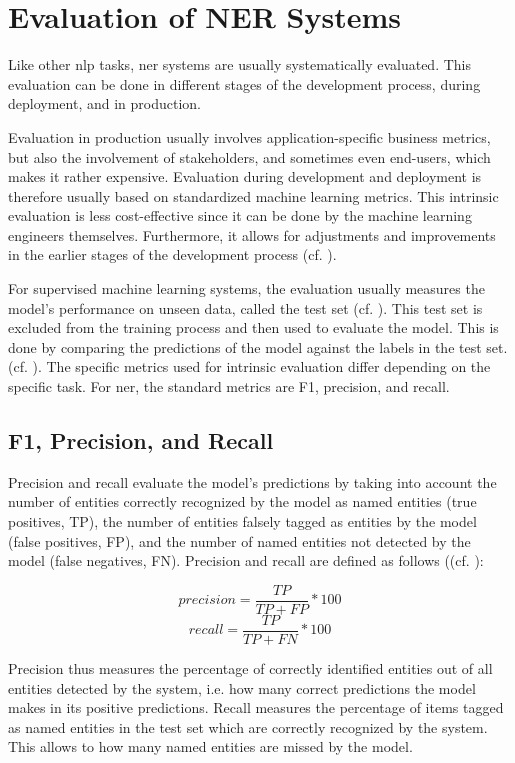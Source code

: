 \section{Evaluation of NER Systems}
\label{evaluation_metrics}

Like other \gls{nlp} tasks, \gls{ner} systems are usually systematically evaluated. This evaluation can be done in different stages of the development process, during deployment, and in production. 

Evaluation in production usually involves application-specific business metrics, but also the involvement of stakeholders, and sometimes even end-users, which makes it rather expensive. 
Evaluation during development and deployment is therefore usually based on standardized machine learning metrics. This intrinsic evaluation is less cost-effective since it can be done by the machine learning engineers themselves. Furthermore, it allows for adjustments and improvements in the earlier stages of the development process (cf. \cite[71]{vajjala_practical_2020}). 

For supervised machine learning systems, the evaluation usually measures  the model's performance on unseen data, called the test set (cf. \cite[35]{jurafsky_2021}). 
This test set is excluded from the training process and then used to evaluate the model. This is done by comparing the predictions of the model against the labels in the test set. (cf. \cite[241]{zong_information_2021}). The specific metrics used for intrinsic evaluation differ depending on the specific task. For \gls{ner}, the standard metrics are F1, precision, and recall. 

\subsection{F1, Precision, and Recall}

Precision and recall evaluate the model's predictions by taking into account the number of entities correctly recognized by the model as named entities (true positives, TP), the number of entities falsely tagged as entities by the model (false positives, FP), and the number of named entities not detected by the model (false negatives, FN). Precision and recall are defined as follows ((cf. \cite[241]{zong_information_2021}): 

$$ precision = \frac {TP} {TP + FP} * 100 $$
$$ recall = \frac {TP}  {TP + FN} * 100 $$

Precision thus measures the percentage of correctly identified entities out of all entities detected by the system, i.e. how many correct predictions the model makes in its positive predictions. Recall measures the percentage of items tagged as named entities in the test set which are correctly recognized by the system. This allows to how many named entities are missed by the model. 

